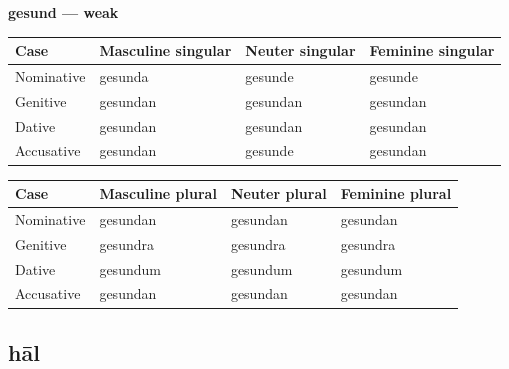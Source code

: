 \textbf{gesund — weak}

\par\begingroup
\fontsize{10.5}{13.2}\selectfont
\setlength{\LTleft}{0pt}\setlength{\LTright}{\fill}
\noindent
\begin{tabular}{@{}>{\raggedright\arraybackslash}p{22.0mm}>{\raggedright\arraybackslash}p{31.188mm}>{\raggedright\arraybackslash}p{31.188mm}>{\raggedright\arraybackslash}p{31.188mm}@{}}
\toprule
\textbf{Case} & \textbf{Masculine singular} & \textbf{Neuter singular} & \textbf{Feminine singular} \\
\midrule
Nominative & gesunda & gesunde & gesunde \\
Genitive & gesundan & gesundan & gesundan \\
Dative & gesundan & gesundan & gesundan \\
Accusative & gesundan & gesunde & gesundan \\
\bottomrule
\end{tabular}
\par\endgroup
\par\addvspace{5pt}
\par\begingroup
\fontsize{10.5}{13.2}\selectfont
\setlength{\LTleft}{0pt}\setlength{\LTright}{\fill}
\noindent
\begin{tabular}{@{}>{\raggedright\arraybackslash}p{22.0mm}>{\raggedright\arraybackslash}p{31.188mm}>{\raggedright\arraybackslash}p{31.188mm}>{\raggedright\arraybackslash}p{31.188mm}@{}}
\toprule
\textbf{Case} & \textbf{Masculine plural} & \textbf{Neuter plural} & \textbf{Feminine plural} \\
\midrule
Nominative & gesundan & gesundan & gesundan \\
Genitive & gesundra & gesundra & gesundra \\
Dative & gesundum & gesundum & gesundum \\
Accusative & gesundan & gesundan & gesundan \\
\bottomrule
\end{tabular}
\par\endgroup

\subsection*{hāl}

